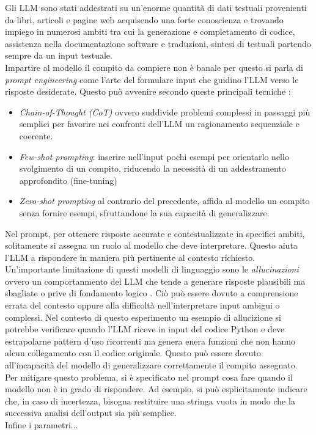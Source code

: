 \documentclass{article}
\begin{document}
\begin{itemize}
Gli LLM sono stati addestrati su un'enorme quantità di dati testuali provenienti da libri, articoli e pagine web acquisendo una forte conoscienza e trovando impiego in numerosi ambiti tra cui la generazione e completamento di codice, assistenza nella documentazione software e traduzioni, sintesi di testuali \cite{di2025use} partendo sempre da un input testuale.\\
Impartire al modello il compito da compiere non è banale per questo si parla di \textit{prompt engineering} come l'arte del formulare input che guidino l'LLM verso le risposte desiderate. Questo può avvenire secondo queste principali tecniche \cite{di2025use}:
\begin{itemize}
    \item \textit{Chain-of-Thought (CoT)} ovvero suddivide problemi complessi in passaggi più semplici per favorire nei confronti dell'LLM un ragionamento sequenziale e coerente.
    \item \textit{Few-shot prompting}: inserire nell'input pochi esempi per orientarlo nello svolgimento di un compito, riducendo la necessità di un addestramento approfondito (fine-tuning)
    \item \textit{Zero-shot prompting} al contrario del precedente, affida al modello un compito senza fornire esempi, sfruttandone la sua capacità di generalizzare.
\end{itemize}
Nel prompt, per ottenere risposte accurate e contestualizzate in specifici ambiti, solitamente si assegna un ruolo al modello che deve interpretare. Questo aiuta l'LLM a rispondere in maniera più pertinente al contesto richiesto.\\
Un'importante limitazione di questi modelli di linguaggio sono le \textit{allucinazioni} ovvero un comportanmento del LLM che tende a generare risposte plausibili ma sbagliate o prive di fondamento logico \cite{di2025use}. Ciò può essere dovuto a comprensione errata del contesto oppure alla difficoltà nell’interpretare input ambigui o complessi. Nel contesto di questo esperimento un esempio di allucizione si potrebbe verificare quando l'LLM riceve in input del codice Python e deve estrapolarne pattern d'uso ricorrenti ma genera enera funzioni che non hanno alcun collegamento con il codice originale. Questo può essere dovuto all’incapacità del modello di generalizzare correttamente il compito assegnato. Per mitigare questo problema, si è specificato nel prompt cosa fare quando il modello non è in grado di rispondere. Ad esempio, si può esplicitamente indicare che, in caso di incertezza, bisogna restituire una stringa vuota in modo che la successiva analisi dell'output sia più semplice.\\
Infine i parametri...

\end{itemize}
\end{document}
